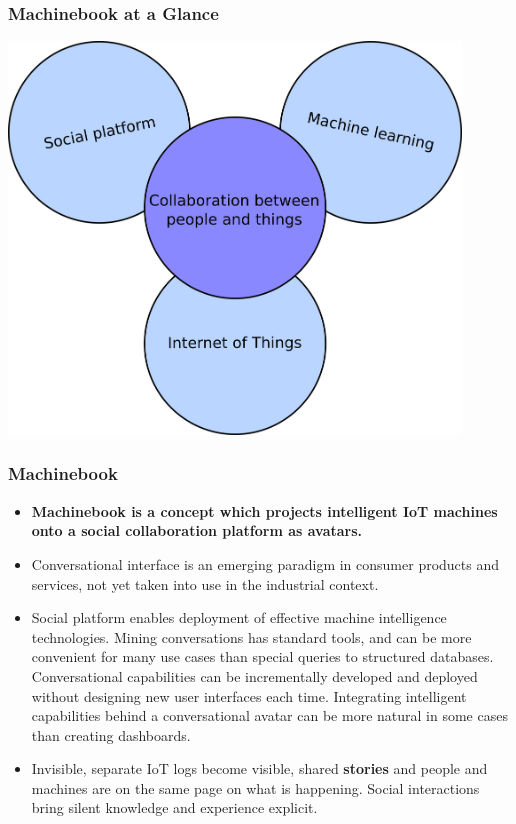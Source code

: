 \documentclass[8pt]{beamer}
\begin{document}
\begin{frame}
\frametitle{Machinebook at a Glance}
\includegraphics[width=0.9\textwidth]{./machinebook_concept.png}
\end{frame}

\begin{frame}
\frametitle{Machinebook}
\begin{itemize}
 \item \textbf{Machinebook is a concept which projects intelligent IoT machines onto a social collaboration platform as avatars.}
 \item Conversational interface is an emerging paradigm in consumer products and services, not yet taken into use in the industrial context.
 \item Social platform enables deployment of effective machine intelligence technologies. Mining conversations has standard tools, and can be more convenient for
       many use cases than special queries to structured databases. Conversational capabilities can be incrementally developed and deployed without designing
       new user interfaces each time. Integrating intelligent capabilities behind a conversational avatar can be more natural in some cases than creating dashboards.
 \item Invisible, separate IoT logs become visible, shared \textbf{stories} and people and machines are on the same page on what is happening.
       Social interactions bring silent knowledge and experience explicit.
\end{itemize}
\end{frame}
      
\end{document}
